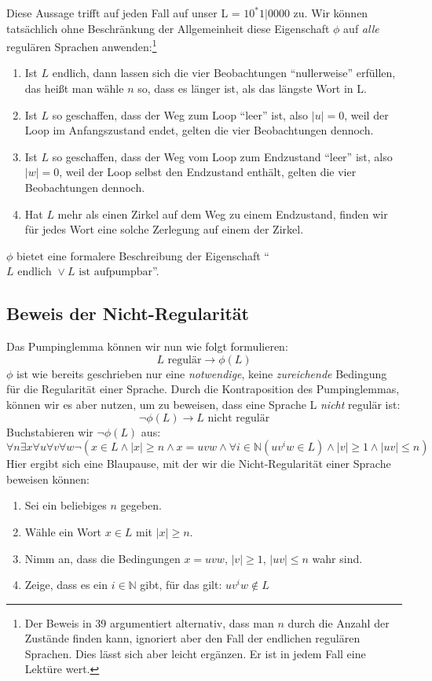 Diese Aussage trifft auf jeden Fall auf unser L = $10^*1|0000$ zu.
Wir können tatsächlich ohne Beschränkung der Allgemeinheit diese Eigenschaft $\phi$ auf
\emph{alle} regulären Sprachen anwenden:\footnote{
    Der Beweis in \cite{schoening} 39 argumentiert alternativ,
    dass man $n$ durch die Anzahl der Zustände finden kann,
    ignoriert aber den Fall der endlichen regulären Sprachen.
    Dies lässt sich aber leicht ergänzen.
    Er ist in jedem Fall eine Lektüre wert.}
\begin{enumerate}
    \item Ist $L$ endlich, dann lassen sich die vier Beobachtungen ``nullerweise'' erfüllen,
        das heißt man wähle $n$ so,
        dass es länger ist, als das längste Wort in L.
    \item Ist $L$ so geschaffen, dass der Weg zum Loop ``leer'' ist, 
        also $|u| = 0$,
        weil der Loop im Anfangszustand endet, 
        gelten die vier Beobachtungen dennoch.
    \item Ist $L$ so geschaffen, dass der Weg vom Loop zum Endzustand ``leer'' ist, 
        also $|w| = 0$,
        weil der Loop selbst den Endzustand enthält,
        gelten die vier Beobachtungen dennoch.
    \item Hat $L$ mehr als einen Zirkel auf dem Weg zu einem Endzustand,
        finden wir für jedes Wort eine solche Zerlegung auf einem der Zirkel.
\end{enumerate}
$\phi$ bietet eine formalere Beschreibung der Eigenschaft
``$L \text{ endlich } \vee L \text{ ist aufpumpbar}$''.
\subsection{Beweis der Nicht-Regularität}
Das Pumpinglemma können wir nun wie folgt formulieren:
\[
    L \text{ regulär} \rightarrow \phi(L)
\]
$\phi$ ist wie bereits geschrieben nur eine \emph{notwendige},
keine \emph{zureichende} Bedingung für die Regularität einer Sprache.
Durch die Kontraposition des Pumpinglemmas, können wir es aber nutzen,
um zu beweisen, dass eine Sprache L \emph{nicht} regulär ist:
\[
    \neg \phi(L) \rightarrow L \text{ nicht regulär}
\]
Buchstabieren wir $\neg \phi(L)$ aus:
\[
    \forall n \exists x \forall u \forall v \forall w 
        \neg(
                    x \in L
            \wedge  |x| \geq n
            \wedge  x = uvw 
            \wedge  \forall i \in \mathbb{N} (uv^iw \in L)
            \wedge  |v| \geq 1  
            \wedge  |uv| \leq n
        )
\]
Hier ergibt sich eine Blaupause,
mit der wir die Nicht-Regularität einer Sprache beweisen können:
\begin{enumerate}
    \item Sei ein beliebiges $n$ gegeben.
    \item Wähle ein Wort $x \in L$ mit $|x| \geq n $.
    \item Nimm an, dass die Bedingungen $x = uvw$, $|v| \geq 1$, $|uv| \leq n$ wahr sind.
    \item Zeige, dass es ein $i \in \mathbb{N}$ gibt, für das gilt: $uv^iw \notin L$
\end{enumerate}

